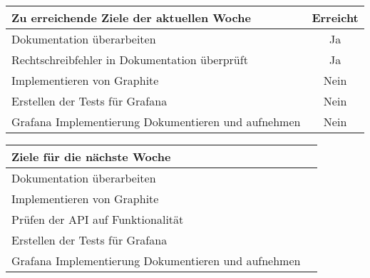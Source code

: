 \begin{tabularx}{\textwidth}{Xc}
    \arrayrulecolor{OliveGreen}
    \toprule
    {\bfseries Zu erreichende Ziele der aktuellen Woche} & {\bfseries Erreicht} \\
    \midrule[2pt]
    Dokumentation überarbeiten                              &Ja              \\
    \rowcolor{OliveGreen!15}
    Rechtschreibfehler in Dokumentation überprüft           &Ja              \\
    \rowcolor{White}
    Implementieren von Graphite                             &Nein            \\
    \rowcolor{OliveGreen!15}
    Erstellen der Tests für Grafana                         &Nein            \\
    \rowcolor{White}
    Grafana Implementierung Dokumentieren und aufnehmen     &Nein            \\
    \bottomrule[2pt]
\end{tabularx}
%
\vspace{1cm}
%
\begin{tabularx}{\textwidth}{Xc}
    \arrayrulecolor{OliveGreen}
    \toprule
    {\bfseries Ziele für die nächste Woche}        &                         \\
    \midrule[2pt]
    Dokumentation überarbeiten                     &                         \\
    \rowcolor{OliveGreen!15}
    Implementieren von Graphite                   &                          \\
    \rowcolor{White}
    Prüfen der API auf Funktionalität             &                          \\
    \rowcolor{OliveGreen!15}
    Erstellen der Tests für Grafana               &                          \\
    \rowcolor{White}
    Grafana Implementierung Dokumentieren und aufnehmen &                    \\
\end{tabularx}
